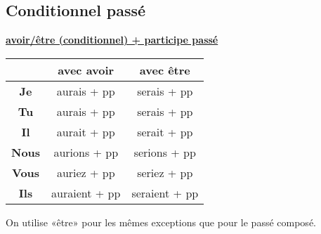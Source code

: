 \documentclass[12pt, a4paper]{article}
\begin{document}
\begin{multicols*}{3}
\subsection{Conditionnel passé}
\begin{center}
\underline{\textbf{avoir/être (conditionnel) + participe passé}}
\begin{tabular}{|c|c|c|}
  \hline
  & \textbf{avec avoir} & \textbf{avec être}\\\hline
  \textbf{Je} & aurais + pp & serais + pp \\\hline
  \textbf{Tu} & aurais + pp & serais + pp \\\hline
  \textbf{Il} & aurait + pp & serait + pp \\\hline
  \textbf{Nous} & aurions + pp & serions + pp \\\hline
  \textbf{Vous} & auriez + pp & seriez + pp \\\hline
  \textbf{Ils} & auraient + pp & seraient + pp \\\hline
\end{tabular}
\end{center}

On utilise «être» pour les mêmes exceptions que pour le passé composé.
\colbreak


\end{multicols*}
\end{document}
